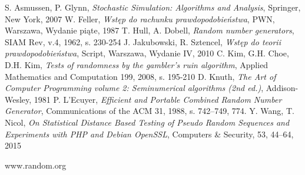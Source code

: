 \documentclass[a4paper,11pt,twoside]{book}
\theoremstyle{definition}
\begin{document}
\begin{thebibliography}{99}
    S. Asmussen, P. Glynn, \emph{Stochastic Simulation: Algorithms and Analysis}, Springer, New York, 2007
    W. Feller, \emph{Wstęp do rachunku prawdopodobieństwa}, PWN, Warszawa, Wydanie piąte, 1987
    T. Hull, A. Dobell, \emph{Random number generators}, SIAM Rev, v.4, 1962, s. 230-254
    J. Jakubowski, R. Sztencel, \emph{Wstęp do teorii prawdopodobieństwa}, Script, Warszawa, Wydanie IV, 2010
    C. Kim, G.H. Choe, D.H. Kim, \emph{Tests of randomness by the gambler's ruin algorithm},  Applied Mathematics and Computation 199, 2008, s. 195-210
    D. Knuth, \emph{The Art of Computer Programming volume 2: Seminumerical algorithms (2nd ed.)}, Addison-Wesley, 1981
    P. L'Ecuyer, \emph{Efficient and Portable Combined Random Number Generator}, Communications of the ACM 31, 1988, s. 742–749, 774.
    Y. Wang, T. Nicol, \emph{On Statistical Distance Based Testing of Pseudo Random Sequences and Experiments with PHP and Debian OpenSSL}, Computers \& Security, 53, 44--64, 2015


    www.random.org
\end{thebibliography}
\end{document}
